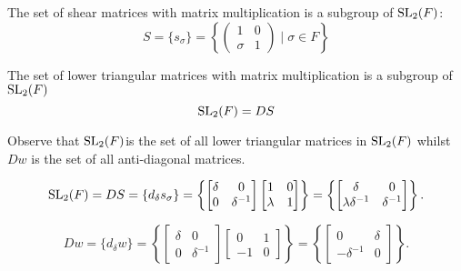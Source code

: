 \begin{definition}
\label{SpecialSubgroups.S}
    The set of shear matrices with matrix multiplication is a subgroup of $\operatorname{SL}_2(F)$:
    \[
    S = \{s_\sigma\} = \left\{\begin{pmatrix}1 & 0\\ \sigma & 1\end{pmatrix} \; | \; \sigma \in F \right\}
    \]
\end{definition}

\begin{definition}
\label{SpecialSubgroups.L}
\leanok
    The set of lower triangular matrices with matrix multiplication is a subgroup of $\operatorname{SL}_2(F)$
    \[
    \operatorname{SL}_2(F)= DS
    \]
\end{definition}

Observe that $\operatorname{SL}_2(F)$is the set of all lower triangular matrices in $\operatorname{SL}_2(F)$ whilst $Dw$ is the set of all anti-diagonal matrices.

\begin{equation} \label{Hlowertri} \operatorname{SL}_2(F)= DS =  \{d_\delta s_\sigma\} = \left\{ \begin{bmatrix} \delta & 0 \\ 0 & \delta^{-1} \end{bmatrix} \begin{bmatrix} 1 & 0 \\ \lambda & 1 \end{bmatrix} \right\} = \left\{ \begin{bmatrix} \delta & 0 \\ \lambda \delta^{-1} & \delta^{-1} \end{bmatrix}  \right\}. \end{equation}

\begin{equation} \label{antidiag} Dw = \{ d_\delta w \} =  \left\{  \begin{bmatrix} \delta & 0 \\ 0 & \delta^{-1} \end{bmatrix} \begin{bmatrix} 0 & 1 \\ -1 & 0 \end{bmatrix} \right\} = \left\{ \begin{bmatrix} 0 & \delta \\ -\delta^{-1} & 0 \end{bmatrix}  \right\}. \end{equation}

